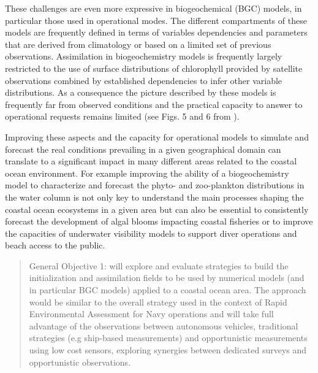 These challenges are even more expressive in biogeochemical (BGC)
models, in particular those used in operational modes. The different
compartments of these models are frequently defined in terms of
variables dependencies and parameters that are derived from
climatology or based on a limited set of previous
observations. Assimilation in biogeochemistry models is frequently
largely restricted to the use of surface distributions of chlorophyll
provided by satellite observations combined by established
dependencies to infer other variable distributions. As a consequence
the picture described by these models is frequently far from observed
conditions and the practical capacity to answer to operational
requests remains limited (see Figs. 5 and 6 from \cite{marta012}).
 
Improving these aspects and the capacity for operational models to
simulate and forecast the real conditions prevailing in a given
geographical domain can translate to a significant impact in many
different areas related to the coastal ocean environment. For example
improving the ability of a biogeochemistry model to characterize and
forecast the phyto- and zoo-plankton distributions in the water column
is not only key to understand the main processes shaping the coastal
ocean ecosystems in a given area but can also be essential to
consistently forecast the development of algal blooms impacting
coastal fisheries or to improve the capacities of underwater
visibility models to support diver operations and beach access to the
public.
 
\begin{quote}
  General Objective 1: \proj will explore and evaluate strategies to
  build the initialization and assimilation fields to be used by
  numerical models (and in particular BGC models) applied to a coastal
  ocean area. The approach would be similar to the overall strategy
  used in the context of Rapid Environmental Assessment for Navy
  operations and will take full advantage of the observations between
  autonomous vehicles, traditional strategies (e.g ship-based
  measurements) and opportunistic measurements using low cost sensors,
  exploring synergies between dedicated surveys and opportunistic
  observations.
\end{quote}
 
